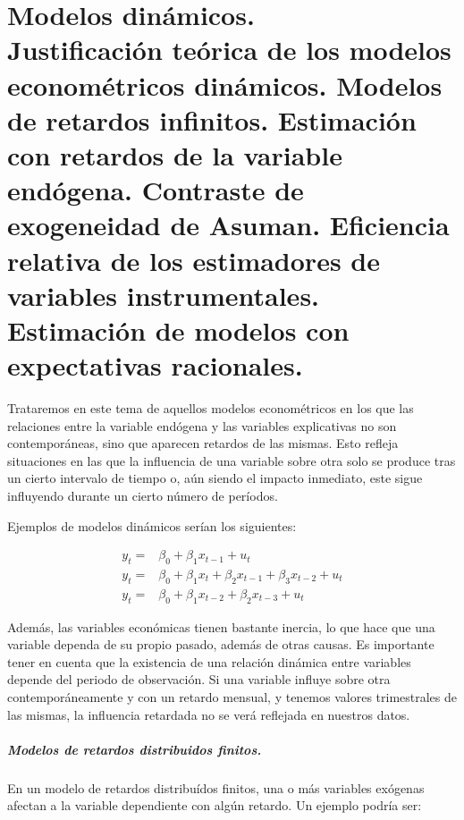 \chapter[Modelos din\'amicos.]{Modelos din\'amicos. \\
\normalsize  Justificaci\'on te\'orica de los modelos econom\'etricos
din\'amicos. Modelos de retardos infinitos. Estimaci\'on con retardos
de la variable end\'ogena. Contraste de exogeneidad de Asuman. Eficiencia
relativa de los estimadores de variables instrumentales. Estimaci\'on
de modelos con expectativas racionales.}




Trataremos en este tema de aquellos modelos econom\'etricos en los que las relaciones entre la variable end\'ogena y las variables explicativas no son contempor\'aneas, sino que aparecen retardos de las mismas. Esto refleja situaciones en las que la influencia de una variable sobre otra solo se produce tras un cierto intervalo de tiempo o, a\'un siendo el impacto inmediato, este sigue influyendo durante un cierto n\'umero de per\'iodos.

Ejemplos de modelos din\'amicos ser\'ian los siguientes:

\begin{align*}
y_t=&\beta_0+\beta_1x_{t-1}+u_t\\
y_t=&\beta_0+\beta_1x_t+\beta_2x_{t-1}+\beta_3x_{t-2}+u_t\\
y_t=&\beta_0+\beta_1x_{t-2}+\beta_2x_{t-3}+u_t
\end{align*}

Adem\'as, las variables econ\'omicas tienen bastante inercia, lo que hace que una variable dependa de su propio pasado, adem\'as de otras causas. Es importante tener en cuenta que la existencia de una relaci\'on din\'amica entre variables depende del periodo de observaci\'on. Si una variable influye sobre otra contempor\'aneamente y con un retardo mensual, y tenemos valores trimestrales de las mismas, la influencia retardada no se ver\'a reflejada en nuestros datos.

\paragraph{Modelos de retardos distribuidos finitos.}

En un modelo de retardos distribu\'idos finitos, una o m\'as variables ex\'ogenas afectan a la variable dependiente con alg\'un retardo. Un ejemplo podr\'ia ser:

